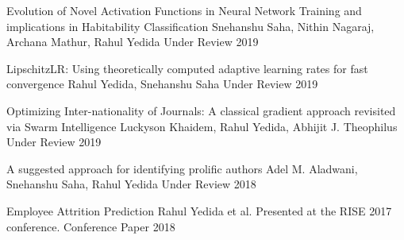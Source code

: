 


\begin{cvhonors}

    \cvhonor
        {Evolution of Novel Activation Functions in Neural Network Training and implications in Habitability Classification}
        {Snehanshu Saha, Nithin Nagaraj, Archana Mathur, Rahul Yedida}
        {Under Review}
        {2019}

  \cvhonor
    {LipschitzLR: Using theoretically computed adaptive learning rates for fast convergence}
    {Rahul Yedida, Snehanshu Saha}
    {Under Review} %
    {2019} %


  \cvhonor
    {Optimizing Inter-nationality of Journals: A classical gradient approach revisited via Swarm Intelligence}
    {Luckyson Khaidem, Rahul Yedida, Abhijit J. Theophilus}
    {Under Review} %
    {2019} %
    
  \cvhonor
    {A suggested approach for identifying prolific authors}
    {Adel M. Aladwani, Snehanshu Saha, Rahul Yedida}
    {Under Review} %
    {2018} %

  \cvhonor
    {Employee Attrition Prediction}
    {Rahul Yedida et al. Presented at the RISE 2017 conference.}
    {Conference Paper}
    {2018}

\end{cvhonors}